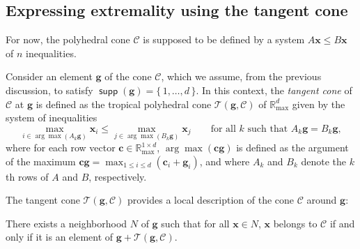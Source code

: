 \documentclass[proceedings]{stacs}
\newcommand{\maxplus}{\mathbb{R}_{\max}}
\newcommand{\vect}[1]{\boldsymbol #1}
\newcommand{\CC}{\mathcal{C}}
\newcommand{\supp}{\operatorname{\mathsf{supp}}}
\newcommand{\argmax}{\arg\max}\newcommand{\tangent}{\mathcal{T}}
\begin{document}
\subsection{Expressing extremality using the tangent cone} 

For now, the polyhedral cone $\CC$ is supposed to be defined by a system $A \vect{x} \leq B \vect{x}$ of $n$ inequalities. 


Consider an element $\vect{g}$ of the cone $\CC$,
which we assume, from the previous discussion,
to satisfy $\supp(\vect g)=\{\,1,\ldots,d\,\}$.
In this context, the \emph{tangent cone} of $\CC$ at $\vect{g}$ is defined as the tropical polyhedral cone $\tangent( \vect{g}, \CC)$ of $\maxplus^d$ given by the system of inequalities
\begin{equation}
\max_{i \in \argmax(A_k \vect{g})} \vect{x}_i \leq \max_{j \in \argmax(B_k \vect{g})} \vect{x}_j \qquad \text{for all }k \text{ such that }A_k \vect{g} = B_k \vect{g}, \label{eq:tangent_constraint}
\end{equation}
where for each row vector $\vect{c} \in \maxplus^{1 \times d}$, $\argmax(\vect{c} \vect{g})$ is defined as the argument of the maximum $\vect{c} \vect{g} = \max_{1 \leq i \leq d} (\vect{c}_i + \vect{g}_i)$, and where $A_k$ and $B_k$ denote the $k$th rows of $A$ and $B$, respectively.


The tangent cone $\tangent(\vect{g},\CC)$ provides a local description of the cone $\CC$ around $\vect{g}$:
\begin{proposition}\label{prop:tangent_cone}
There exists a neighborhood $N$ of $\vect{g}$ such that for all $\vect{x} \in N$, $\vect{x}$ belongs to $\CC$ if and only if it is an element of $\vect{g} + \tangent(\vect{g},\CC)$.
\end{proposition}
\end{document}
